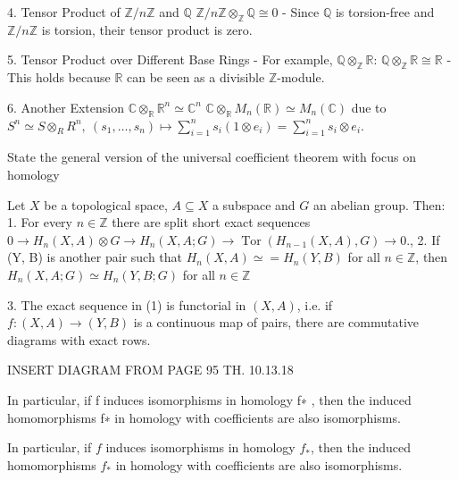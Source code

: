 4. Tensor Product of \(\mathbb{Z}/n\mathbb{Z}\) and \(\mathbb{Q}\)
\(
\mathbb{Z}/n\mathbb{Z} \otimes_{\mathbb{Z}} \mathbb{Q} \cong 0
\)
- Since \(\mathbb{Q}\) is torsion-free and \(\mathbb{Z}/n\mathbb{Z}\) is torsion, their tensor product is zero.

5. Tensor Product over Different Base Rings
- For example, \(\mathbb{Q} \otimes_{\mathbb{Z}} \mathbb{R}\):
\(
\mathbb{Q} \otimes_{\mathbb{Z}} \mathbb{R} \cong \mathbb{R}
\)
- This holds because \(\mathbb{R}\) can be seen as a divisible \(\mathbb{Z}\)-module.

6. Another Extension
\( \mathbb{C} \otimes_{\mathbb{R}} \mathbb{R}^n \simeq \mathbb{C}^n \)
\( \mathbb{C} \otimes_{\mathbb{R}} M_n(\mathbb{R}) \simeq M_n(\mathbb{C}) \)
due to \( S^n \simeq S \otimes_R R^n,\ (s_1, \dots, s_n) \mapsto \sum_{i=1}^n s_i(1 \otimes e_i) = \sum_{i=1}^n s_i \otimes e_i \).

State the general version of the universal coefficient theorem with focus on homology

Let \( X \) be a topological space, \(A ⊆ X\)  a subspace and \( G \) an abelian group.
Then:
1. For every \( n \in \mathbb{Z} \) there are split short exact sequences
\(0 \longrightarrow H_{n}(X, A) \otimes G \longrightarrow H_n(X, A; G) \longrightarrow \operatorname{Tor}(H_{n-1}(X, A), G) \longrightarrow 0.\),
2. If (Y, B) is another pair such that \( H_n(X, A) \simeq = H_n(Y, B)\) for all \( n \in \mathbb{Z} \), then
\( H_n(X, A; G) \simeq H_n(Y, B; G)\) for all \( n \in \mathbb{Z}\)

3. The exact sequence in (1) is functorial in \( (X, A) \), i.e. if \( f : (X, A) \to (Y, B) \) is a 
continuous map of pairs, there are commutative diagrams with exact rows.

INSERT DIAGRAM FROM PAGE 95 TH. 10.13.18

In particular, if f induces isomorphisms in homology f∗ , then the induced homomorphisms
f∗ in homology with coefficients are also isomorphisms.

In particular, if \( f \) induces isomorphisms in homology \( f_\ast \), then the induced homomorphisms
\( f_\ast \) in homology with coefficients are also isomorphisms.
